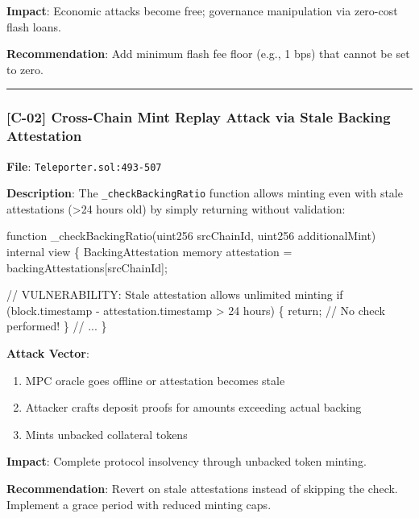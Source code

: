 \documentclass[
]{article}
\newenvironment{Shaded}{}{}
\newcommand{\NormalTok}[1]{#1}
\providecommand{\tightlist}{%
  \setlength{\itemsep}{0pt}\setlength{\parskip}{0pt}}
\begin{document}
\textbf{Impact}: Economic attacks become free; governance manipulation
via zero-cost flash loans.

\textbf{Recommendation}: Add minimum flash fee floor (e.g., 1 bps) that
cannot be set to zero.

\begin{center}\rule{0.5\linewidth}{0.5pt}\end{center}

\subsubsection{{[}C-02{]} Cross-Chain Mint Replay Attack via Stale
Backing
Attestation}\label{c-02-cross-chain-mint-replay-attack-via-stale-backing-attestation}

\textbf{File}: \texttt{Teleporter.sol:493-507}

\textbf{Description}: The \texttt{\_checkBackingRatio} function allows
minting even with stale attestations (\textgreater24 hours old) by
simply returning without validation:

\begin{Shaded}
\begin{Highlighting}[]
\NormalTok{function \_checkBackingRatio(uint256 srcChainId, uint256 additionalMint) internal view \{}
\NormalTok{    BackingAttestation memory attestation = backingAttestations[srcChainId];}

\NormalTok{    // VULNERABILITY: Stale attestation allows unlimited minting}
\NormalTok{    if (block.timestamp {-} attestation.timestamp \textgreater{} 24 hours) \{}
\NormalTok{        return;  // No check performed!}
\NormalTok{    \}}
\NormalTok{    // ...}
\NormalTok{\}}
\end{Highlighting}
\end{Shaded}

\textbf{Attack Vector}:

\begin{enumerate}
\def\labelenumi{\arabic{enumi}.}
\tightlist
\item
  MPC oracle goes offline or attestation becomes stale
\item
  Attacker crafts deposit proofs for amounts exceeding actual backing
\item
  Mints unbacked collateral tokens
\end{enumerate}

\textbf{Impact}: Complete protocol insolvency through unbacked token
minting.

\textbf{Recommendation}: Revert on stale attestations instead of
skipping the check. Implement a grace period with reduced minting caps.
\end{document}
